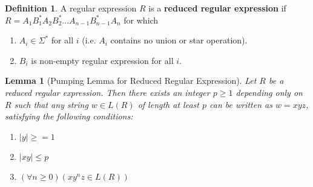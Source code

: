 \documentclass[11pt]{article}
\newtheorem*{lemma}{Lemma}
\theoremstyle{definition}
\newtheorem*{definition}{Definition}
\begin{document}
\begin{definition}
A regular expression $R$ is a \textbf{reduced regular expression} if $R = A_1B_1^*A_2B_2^*...A_{n-1}B_{n-1}^*A_n$ for which
\begin{enumerate}
    \item $A_i \in \Sigma^*$ for all $i$ (i.e. $A_i$ contains no union or star operation).
    \item $B_i$ is non-empty regular expression for all $i$.
\end{enumerate}
\end{definition}
\begin{lemma}[Pumping Lemma for Reduced Regular Expression] Let $R$ be a reduced regular expression. Then there exists an integer $p\geq 1$ depending only on $R$ such that any string $w \in L(R)$ of length at least $p$ can be written as $w = xyz$, satisfying the following conditions:
\begin{enumerate}
    \item $|y| \geq = 1$
    \item $|xy|\leq p$
    \item $(\forall n\geq 0)(xy^nz\in L(R))$
\end{enumerate}
\end{lemma}
\end{document}

